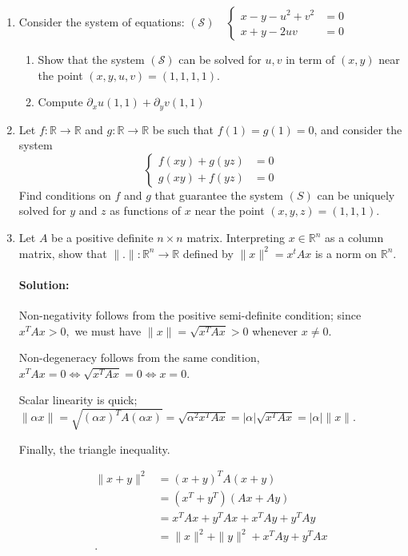 \documentclass{article}
\begin{document}
\begin{enumerate}
\item Consider the system of equations:
$\left(\mathcal{S}\right) \quad 
\begin{cases}
x - y - u^2 + v^2 &= 0 \\
x + y - 2uv &= 0
\end{cases}$

\begin{enumerate}[label= (\alph*)] 
\item Show that the system $(\mathcal{S})$ can be solved for $u,v$ in term of $(x,y)$ near the point $(x,y,u,v)=(1,1,1,1)$.

\item Compute $\partial_x u(1,1)+\partial_y v(1,1)$
\end{enumerate}

\item Let $f:\mathbb{R}\to\mathbb{R}$ and $g:\mathbb{R}\to\mathbb{R}$ be such that $f(1)=g(1)=0$, and consider the system \begin{equation*}
\begin{cases}
f(xy)+g(yz) & = 0 \\
g(xy)+f(yz) & = 0
\end{cases}
\end{equation*}
Find conditions on $f$ and $g$ that guarantee the system $(S)$ can be uniquely solved for $y$ and $z$ as functions of $x$ near the point $(x,y,z)=(1,1,1)$.

\item Let $A$ be a positive definite $n\times n$ matrix. Interpreting $x\in\mathbb{R}^n$ as a column matrix, show that $\|.\|:\mathbb{R}^n\to\mathbb{R}$ defined by $\|x\|^2=x^tAx$ is a norm on $\mathbb{R}^n.$

    \paragraph{Solution: } %
    Non-negativity follows from the positive semi-definite condition; since $x^{T}Ax>0,$ we must have $\|x\|=\sqrt{x^{T}Ax} >0$ whenever $x\neq 0$.

    Non-degeneracy follows from the same condition, $x^{T}Ax=0\iff \sqrt{x^{T}Ax} =0\iff x=0$.

    Scalar linearity is quick; $\|\alpha x\|=\sqrt{(\alpha x)^{T}A(\alpha x)}=\sqrt{\alpha^2 x^{T}Ax} =|\alpha|\sqrt{x^{T}Ax} =|\alpha|\|x\| $.

    Finally, the triangle inequality. 

    \begin{align*}
        \|x+y\|^2&= (x+y)^{T}A(x+y)\\
                 &=(x^{T}+y^{T})(Ax+Ay) \\
                 &= x^{T}Ax+y^{T}Ax+x^{T}Ay+y^{T}Ay \\
                 &= \|x\|^2+\|y\|^2+x^{T}Ay+y^{T}Ax \\
    .\end{align*}
\fi

\end{enumerate}
\end{document}
